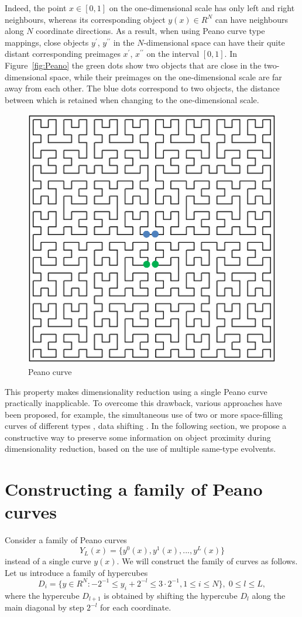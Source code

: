 \documentclass[entropy,article,submit,moreauthors,pdftex]{Definitions/mdpi}
\begin{document}
Indeed, the point $x \in [0,1]$ on the one-dimensional scale has only left and right neighbours, whereas its corresponding object $y(x) \in R^N$ can have neighbours along $N$ coordinate directions. As a result, when using Peano curve type mappings, close objects $y^\prime$, $y^{\prime\prime}$ in the $N$-dimensional space can have their quite distant corresponding preimages $x^\prime$, $x^{\prime\prime}$ on the interval $[0,1]$. In Figure~\ref{fig:Peano} the green dots show two objects that are close in the two-dimensional space, while their preimages on the one-dimensional scale are far away from each other. The blue dots correspond to two objects, the distance between which is retained when changing to the one-dimensional scale.

\begin{figure}
\center
\includegraphics[width=0.5\linewidth]{fig1.png}
\caption{Peano curve}\label{fig:Peano}
\label{fig1}
\end{figure}   

This property makes dimensionality reduction using a single Peano curve practically inapplicable. To overcome this drawback, various approaches have been proposed, for example, the simultaneous use of two or more space-filling curves of different types \cite{Scott1999}, data shifting \cite{Liao2001}. In the following section, we propose a constructive way to preserve some information on object proximity during dimensionality reduction, based on the use of multiple same-type evolvents.

\section{Constructing a family of Peano curves}\label{MPeano}

Consider a family of Peano curves
\begin{equation}\label{EvSet}
Y_L(x)=\{ y^0(x), y^1(x), ..., y^L(x) \}
\end{equation} 
instead of a single curve $y(x)$. We will construct the family of curves as follows. Let us introduce a family of hypercubes
\begin{equation}\label{hypercubes}
D_i = \{ y \in R^N: -2^{-1} \leq y_i + 2^{-l} \leq 3 \cdot 2^{-1},  1 \leq i \leq N \}, \; 0 \leq l \leq L,
\end{equation} 
where the hypercube $D_{l+1}$ is obtained by shifting the hypercube $D_l$ along the main diagonal by step $2^{-l}$ for each coordinate.
\end{document}
